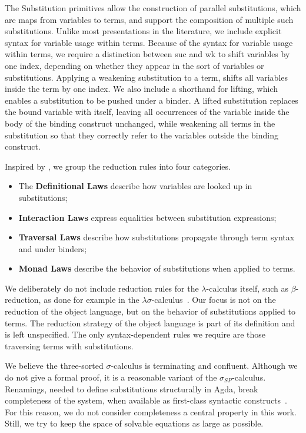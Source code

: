 \documentclass[screen,nonacm]{acmart}
\newcommand{\bsym}[1]{\textcolor{agdablue}{#1}}
\begin{document}
The Substitution primitives allow the construction of parallel substitutions,
which are maps from variables to terms, and support the composition of multiple
such substitutions. Unlike most presentations in the literature, we include
explicit syntax for variable usage within terms. Because of the syntax for
variable usage within terms, we require a distinction between
\bsym{\textsf{suc}} and \bsym{\textsf{wk}} to shift variables by one index,
depending on whether they appear in the sort of variables or substitutions.
Applying a weakening substitution to a term, shifts all variables inside the
term by one index. We also include a shorthand for lifting, which enables a
substitution to be pushed under a binder. A lifted substitution replaces the
bound variable with itself, leaving all occurrences of the variable inside the
body of the binding construct unchanged, while weakening all terms in the
substitution so that they correctly refer to the variables outside the binding
construct.

Inspired by \citet{Stark:2020:Mechanising}, we group the reduction rules into
four categories.
\begin{itemize}
      \item The \textbf{Definitional Laws} describe how variables are looked up in
            substitutions;
      \item \textbf{Interaction Laws} express equalities between substitution expressions;
      \item \textbf{Traversal Laws} describe how substitutions propagate through term syntax and under binders;
      \item \textbf{Monad Laws} describe the behavior of substitutions when applied to
            terms.
\end{itemize}

\noindent We deliberately do not include reduction rules for the $λ$-calculus itself, such as
$β$-reduction, as done for example in the $λσ$-calculus~\cite{10.1145/226643.226675}.
Our focus is not on the reduction of the object language, but on the behavior
of substitutions applied to terms. The reduction strategy of the object
language is part of its definition and is left unspecified.
The only syntax-dependent rules we require are those traversing terms with substitutions.

We believe the three-sorted $σ$-calculus is terminating and confluent. Although
we do not give a formal proof, it is a reasonable variant of the
$σ_{SP}$-calculus. Renamings, needed to define substitutions structurally in
Agda, break completeness of the system, when available as first-class syntactic
constructs~\cite{10.1145/3293880.3294101}. For this reason, we do not consider
completeness a central property in this work. Still, we try to keep the space
of solvable equations as large as possible.
\end{document}
